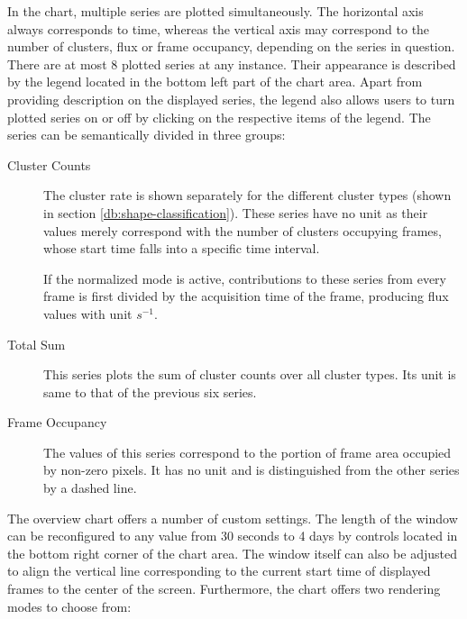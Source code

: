 In the chart, multiple series are plotted simultaneously. The horizontal axis always corresponds to time, whereas the vertical axis may correspond to the number of clusters, flux or frame occupancy, depending on the series in question. There are at most 8 plotted series at any instance. Their appearance is described by the legend located in the bottom left part of the chart area. Apart from providing description on the displayed series, the legend also allows users to turn plotted series on or off by clicking on the respective items of the legend. The series can be semantically divided in three groups:

\begin{description}
	\item[Cluster Counts]
	The cluster rate is shown separately for the different cluster types (shown in section \ref{db:shape-classification}). These series have no unit as their values merely correspond with the number of clusters occupying frames, whose start time falls into a specific time interval.

	If the normalized mode is active, contributions to these series from every frame is first divided by the acquisition time of the frame, producing flux values with unit $s^{-1}$.

	\item[Total Sum]
	This series plots the sum of cluster counts over all cluster types. Its unit is same to that of the previous six series.

	\item[Frame Occupancy]
	The values of this series correspond to the portion of frame area occupied by non-zero pixels. It has no unit and is distinguished from the other series by a dashed line. 
\end{description}

The overview chart offers a number of custom settings. The length of the window can be reconfigured to any value from 30 seconds to 4 days by controls located in the bottom right corner of the chart area. The window itself can also be adjusted to align the vertical line corresponding to the current start time of displayed frames to the center of the screen. Furthermore, the chart offers two rendering modes to choose from:

